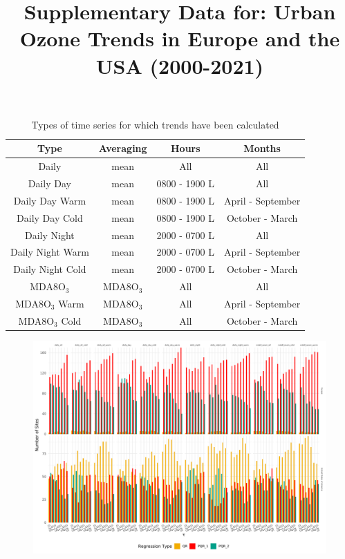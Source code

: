 \documentclass{article}
\title{Supplementary Data for: Urban Ozone Trends in Europe and the USA (2000-2021)}
\date{}
\begin{document}
\maketitle
\clearpage

\begin{table}[h]
\caption{Types of time series for which trends have been calculated}
\begin{tabular}{c|c c c}
Type              & Averaging & Hours         & Months            \\ \hline
Daily             & mean      & All           & All               \\
Daily Day         & mean      & 0800 - 1900 L & All               \\
Daily Day Warm    & mean      & 0800 - 1900 L & April - September \\
Daily Day Cold    & mean      & 0800 - 1900 L & October - March   \\
Daily Night       & mean      & 2000 - 0700 L & All               \\
Daily Night Warm  & mean      & 2000 - 0700 L & April - September \\
Daily Night Cold  & mean      & 2000 - 0700 L & October - March   \\
MDA8O$_3$              & MDA8O$_3$      & All           & All               \\
MDA8O$_3$ Warm         & MDA8O$_3$      & All           & April - September \\
MDA8O$_3$ Cold         & MDA8O$_3$      & All           & October - March   \\
\end{tabular}
\label{si_tab:ts_types}
\end{table}
\clearpage

\begin{figure}
\centering
\includegraphics[width=\linewidth]{figures/si_figures/regression_type/regression_type_bars_o3_all.pdf}
\caption{}
\label{si_fig:reg_bars_all}
\end{figure}
\clearpage
\end{document}
